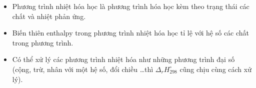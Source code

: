 \documentclass[Main.tex]{subfiles}
\begin{document}
	\newpage
	\begin{hopdongian}
		\begin{itemize}
			\item Phương trình nhiệt hóa học là phương trình hóa học kèm theo trạng thái các chất và nhiệt phản ứng.
			\item Biến thiên enthalpy trong phương trình nhiệt hóa học tỉ lệ với hệ số các chất trong phương trình.
			\item Có thể xử lý các phương trình nhiệt hóa như những phương trình đại số (cộng, trừ, nhân với một hệ số, đổi chiều \ldots thì $\Delta_r H^\circ_{298}$ cũng chịu cùng cách xử lý).
		\end{itemize}
	\end{hopdongian}
\end{document}

